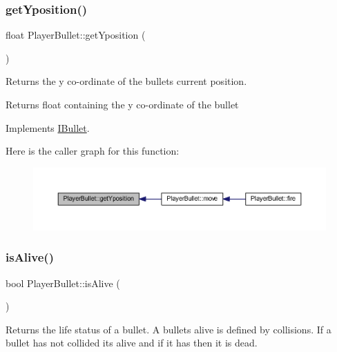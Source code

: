 \subsubsection{\texorpdfstring{get\+Yposition()}{getYposition()}}
{\footnotesize\ttfamily float Player\+Bullet\+::get\+Yposition (\begin{DoxyParamCaption}{ }\end{DoxyParamCaption})\hspace{0.3cm}{\ttfamily [virtual]}}



Returns the y co-\/ordinate of the bullets current position. 

\begin{DoxyReturn}{Returns}
float containing the y co-\/ordinate of the bullet 
\end{DoxyReturn}


Implements \hyperlink{class_i_bullet_a36594de9a0c0ddd7083bca10ef5d8332}{I\+Bullet}.

Here is the caller graph for this function\+:\nopagebreak
\begin{figure}[H]
\begin{center}
\leavevmode
\includegraphics[width=350pt]{class_player_bullet_a240cab35d5d909366986b8661ee65d3c_icgraph}
\end{center}
\end{figure}
\mbox{\label{class_player_bullet_ab4e6b1485e9a63ddc00effc7532a9b09}} 
\subsubsection{\texorpdfstring{is\+Alive()}{isAlive()}}
{\footnotesize\ttfamily bool Player\+Bullet\+::is\+Alive (\begin{DoxyParamCaption}{ }\end{DoxyParamCaption})\hspace{0.3cm}{\ttfamily [virtual]}}



Returns the life status of a bullet. A bullets alive is defined by collisions. If a bullet has not collided its alive and if it has then it is dead. 


